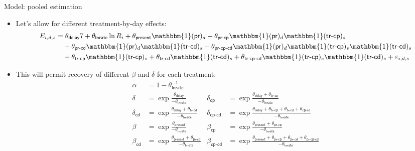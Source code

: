 \documentclass[professionalfont,10pt]{beamer}
\begin{document}
\begin{frame}{Model: pooled estimation}
\begin{itemize}[<+->]
\item Let's allow for different treatment-by-day effects:
\begin{align*}
 E_{i,d,s} &= \theta_{\textsf{delay}} 7 + \theta_{\textsf{lnrate}} \ln R_i + \theta_{\textsf{present}} \mathbbm{1}(\textsf{pr})_{d} + \theta_{\textsf{pr-cp}} \mathbbm{1}(\textsf{pr})_{d} \mathbbm{1}(\textsf{tr-cp})_{s} \\
 & \quad + \theta_{\textsf{pr-cd}} \mathbbm{1}(\textsf{pr})_{d} \mathbbm{1}(\textsf{tr-cd})_{s} + \theta_{\textsf{pr-cp-cd}} \mathbbm{1}(\textsf{pr})_{d} \mathbbm{1}(\textsf{tr-cp})_{s} \mathbbm{1}(\textsf{tr-cd})_{s} \\
 & \quad + \theta_{\textsf{tr-cp}} \mathbbm{1}(\textsf{tr-cp})_{s} + \theta_{\textsf{tr-cd}} \mathbbm{1}(\textsf{tr-cd})_{s} + \theta_{\textsf{tr-cp-cd}} \mathbbm{1}(\textsf{tr-cp})_{s} \mathbbm{1}(\textsf{tr-cd})_{s} + \varepsilon_{i,d,s}
\end{align*}
\item This will permit recovery of \alert{different $\beta$ and $\delta$} for each treatment:
\begin{align*}
  \alpha &= 1-\theta_{\textsf{lnrate}}^{-1} & & \\
  \delta_{\textsf{}} &= \exp \frac{\theta_{\textsf{delay}}}{-\theta_{\textsf{lnrate}}} & \delta_{\textsf{cp}} &= \exp \frac{\theta_{\textsf{delay}} + \theta_{\textsf{tr-cp}}}{-\theta_{\textsf{lnrate}}} \\
  \delta_{\textsf{cd}} &= \exp \frac{\theta_{\textsf{delay}} + \theta_{\textsf{tr-cd}}}{-\theta_{\textsf{lnrate}}} & \delta_{\textsf{cp-cd}} &= \exp \frac{\theta_{\textsf{delay}} + \theta_{\textsf{tr-cp}} + \theta_{\textsf{tr-cd}} + \theta_{\textsf{cp-cd}}}{-\theta_{\textsf{lnrate}}} \\
  \beta_{\textsf{}} &= \exp \frac{\theta_{\textsf{present}}}{-\theta_{\textsf{lnrate}}} & \beta_{\textsf{cp}} &= \exp \frac{\theta_{\textsf{present}} + \theta_{\textsf{pr-cp}}}{-\theta_{\textsf{lnrate}}} \\
  \beta_{\textsf{cd}} &= \exp \frac{\theta_{\textsf{present}} + \theta_{\textsf{pr-cd}}}{-\theta_{\textsf{lnrate}}} & \beta_{\textsf{cp-cd}} &= \exp \frac{\theta_{\textsf{present}} + \theta_{\textsf{pr-cp}} + \theta_{\textsf{pr-cd}} + \theta_{\textsf{pr-cp-cd}}}{-\theta_{\textsf{lnrate}}}
\end{align*}
\end{itemize}
\end{frame}
\end{document}
